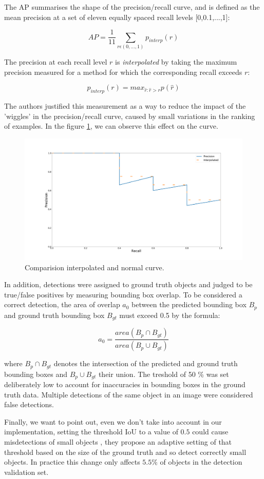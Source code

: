 \documentclass[12pt, a4paper, titlepage,twoside,openright]{article}
\begin{document}
The AP summarises the shape of the precision/recall curve, and is defined as the mean precision at a set of eleven equally spaced recall levels [0,0.1,...,1]:

$$ AP = \dfrac{1}{11} \sum_{r \epsilon (0,...,1)} p_{interp}(r) $$

The precision at each recall level $r$ is \textit{interpolated} by taking the maximum precision measured for a method for which the corresponding recall exceeds $r$:

$$ p_{interp}(r) = max_{\hat r: \hat r>r} p( \hat r)$$

The authors justified this measurement as a way to reduce the impact of the 'wiggles' in the precision/recall curve, caused by small variations in the ranking of examples. In the figure \ref{diagramaI}, we can observe this effect on the curve.

\begin{figure}[H]
\centering         
\includegraphics[width=0.7\linewidth]{evaluacionObject/interpol.png}
\caption{Comparision interpolated and normal curve.} \label{diagramaI}
\end{figure}


In addition, detections were assigned to ground truth objects and judged to be true/false positives by measuring bounding box overlap. To be considered a correct detection, the area of overlap $a_{0}$ between the predicted bounding box $B_{p}$ and ground truth bounding box $ B_{gt}$ must exceed 0.5 by the formula:


$$ a_{0} = \dfrac{area(B_{p} \cap B_{gt})}{area(B_{p} \cup B_{gt})} $$

where $B_{p} \cap B_{gt}$ denotes the intersection of the predicted and ground truth bounding boxes and $ B_{p} \cup B_{gt} $ their union. The treshold of 50 \%  was set deliberately low to account for inaccuracies in bounding boxes in the ground truth data. Multiple detections of the same object in an image were considered false detections.

Finally, we want to point out, even we don't take into account in our implementation,  setting the threshold IoU to a value of $0.5$ could cause misdetections of small objects \cite{imagenet}, they propose an adaptive setting of that threshold based on the size of the ground truth and so detect correctly small objects. In practice this change only affects $5.5\%$ of objects in the detection validation set.
\end{document}
